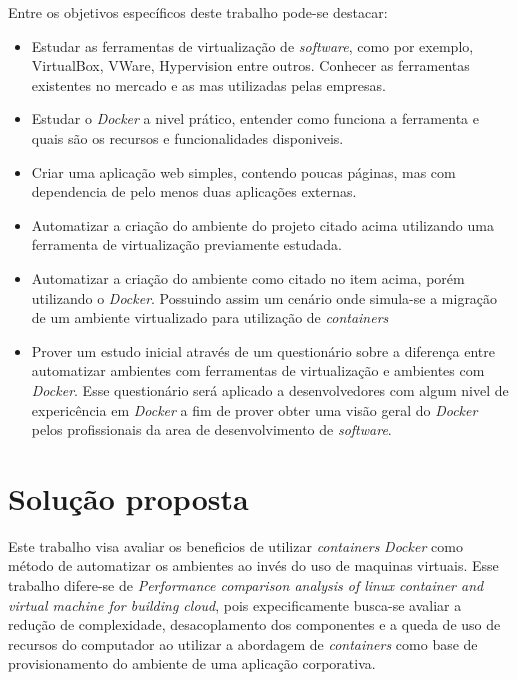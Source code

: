 \documentclass[11pt,a4paper]{article}
\begin{document}
Entre os objetivos específicos deste trabalho pode-se destacar:

\begin{itemize}
  \item Estudar as ferramentas de virtualização de \textit{software}, como por exemplo,
    VirtualBox, VWare, Hypervision entre outros. Conhecer as ferramentas existentes no mercado e as
    mas utilizadas pelas empresas.
  \item Estudar o \textit{Docker} a nivel prático, entender como funciona a ferramenta e quais são os
    recursos e funcionalidades disponiveis.
  \item Criar uma aplicação web simples, contendo poucas páginas, mas com dependencia de pelo menos duas
    aplicações externas.
  \item Automatizar a criação do ambiente do projeto citado acima utilizando uma ferramenta de virtualização
    previamente estudada.
  \item Automatizar a criação do ambiente como citado no item acima, porém utilizando o \textit{Docker}. Possuindo
    assim um cenário onde simula-se a migração de um ambiente virtualizado para utilização de \textit{containers}
  \item Prover um estudo inicial através de um questionário sobre a diferença entre automatizar
    ambientes com ferramentas de virtualização e ambientes com \textit{Docker}. Esse questionário será aplicado
    a desenvolvedores com algum nivel de expericência em \textit{Docker} a fim de prover obter uma visão geral
    do \textit{Docker} pelos profissionais da area de desenvolvimento de \textit{software}.
\end{itemize}

\section{Solução proposta}

Este trabalho visa avaliar os beneficios de utilizar \textit{containers} \textit{Docker} como método de automatizar
os ambientes ao invés do uso de maquinas virtuais. Esse trabalho difere-se de \textit{Performance comparison
analysis of linux container and virtual machine for building cloud}\cite{Performance_container_vm}, pois expecificamente
busca-se avaliar a redução de complexidade, desacoplamento dos componentes e a queda de uso de recursos do computador
ao utilizar a abordagem de \textit{containers} como base de provisionamento do ambiente de uma aplicação corporativa.
\end{document}
